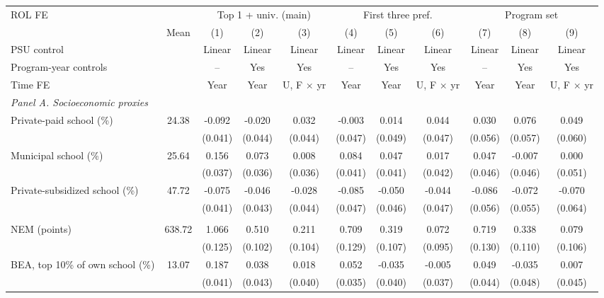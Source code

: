 \begin{tabular}{lc*{9}{c}}
\toprule
ROL FE & & \multicolumn{3}{c}{Top 1 + univ. (main)} & \multicolumn{3}{c}{First three pref.} & \multicolumn{3}{c}{Program set} \\
\cmidrule(lr){3-5}\cmidrule(lr){6-8}\cmidrule(lr){9-11}
 & Mean & (1) & (2) & (3) & (4) & (5) & (6) & (7) & (8) & (9) \\
PSU control &  & Linear & Linear & Linear & Linear & Linear & Linear & Linear & Linear & Linear \\
Program-year controls &  & -- & Yes & Yes & -- & Yes & Yes & -- & Yes & Yes \\
Time FE &  & Year & Year & U, F \(\times\) yr & Year & Year & U, F \(\times\) yr & Year & Year & U, F \(\times\) yr \\
\midrule
\multicolumn{11}{l}{\textit{Panel A. Socioeconomic proxies}} \\
Private-paid school (\%) &  24.38 & -0.092\sym{**} & -0.020 &  0.032 & -0.003 &  0.014 &  0.044 &  0.030 &  0.076 &  0.049 \\
 &  & (0.041) & (0.044) & (0.044) & (0.047) & (0.049) & (0.047) & (0.056) & (0.057) & (0.060) \\
Municipal school (\%) &  25.64 &  0.156\sym{***} &  0.073\sym{**} &  0.008 &  0.084\sym{**} &  0.047 &  0.017 &  0.047 & -0.007 &  0.000 \\
 &  & (0.037) & (0.036) & (0.036) & (0.041) & (0.041) & (0.042) & (0.046) & (0.046) & (0.051) \\
Private-subsidized school (\%) &  47.72 & -0.075\sym{*} & -0.046 & -0.028 & -0.085\sym{*} & -0.050 & -0.044 & -0.086 & -0.072 & -0.070 \\
 &  & (0.041) & (0.043) & (0.044) & (0.047) & (0.046) & (0.047) & (0.056) & (0.055) & (0.064) \\
\addlinespace
\multicolumn{11}{l}{\textit{Panel B. Achievement and other predetermined}} \\
NEM (points) & 638.72 &  1.066\sym{***} &  0.510\sym{***} &  0.211\sym{**} &  0.709\sym{***} &  0.319\sym{***} &  0.072 &  0.719\sym{***} &  0.338\sym{***} &  0.079 \\
 &  & (0.125) & (0.102) & (0.104) & (0.129) & (0.107) & (0.095) & (0.130) & (0.110) & (0.106) \\
BEA, top 10\% of own school (\%) &  13.07 &  0.187\sym{***} &  0.038 &  0.018 &  0.052 & -0.035 & -0.005 &  0.049 & -0.035 &  0.007 \\
 &  & (0.041) & (0.043) & (0.040) & (0.035) & (0.040) & (0.037) & (0.044) & (0.048) & (0.045) \\

\end{tabular}
